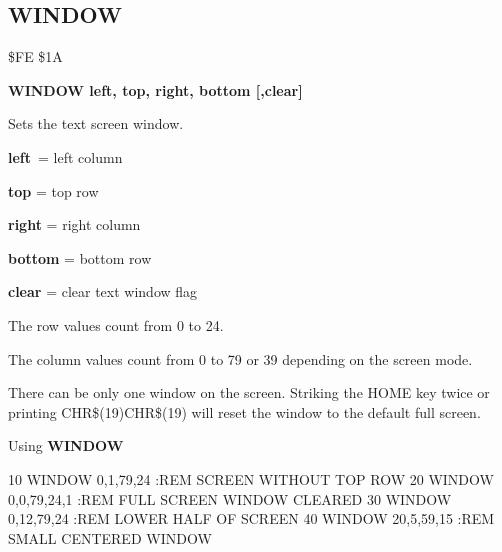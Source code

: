 \subsection{WINDOW}
\begin{description}[leftmargin=3cm,style=nextline]
\item [Token:] \$FE \$1A
\item [Format:] {\bf WINDOW left, top, right, bottom [,clear]}
\item [Usage:] Sets the text screen window.

                 {\bf left} = left column

                 {\bf top} = top row

                 {\bf right} = right column

                 {\bf bottom} = bottom row

                 {\bf clear} = clear text window flag

                 The row values count from 0 to 24.

                 The column values count from 0 to 79 or 39
                 depending on the screen mode.

\item [Remarks:] There can be only one window on the screen.
                 Striking the HOME key twice or printing
                 CHR\$(19)CHR\$(19) will reset the window
                 to the default full screen.

\item [Example:] Using {\bf WINDOW}
\begin{screenoutput}
10 WINDOW 0,1,79,24      :REM SCREEN WITHOUT TOP ROW
20 WINDOW 0,0,79,24,1    :REM FULL SCREEN WINDOW CLEARED
30 WINDOW 0,12,79,24     :REM LOWER HALF OF SCREEN
40 WINDOW 20,5,59,15     :REM SMALL CENTERED WINDOW
\end{screenoutput}
\end{description}

